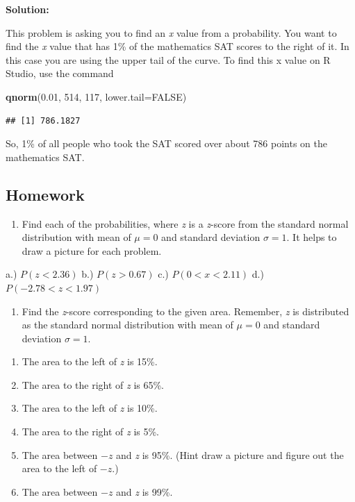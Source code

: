 \documentclass[
]{book}
\newenvironment{Shaded}{\begin{snugshade}}{\end{snugshade}}
\newcommand{\DataTypeTok}[1]{\textcolor[rgb]{0.13,0.29,0.53}{#1}}
\newcommand{\DecValTok}[1]{\textcolor[rgb]{0.00,0.00,0.81}{#1}}
\newcommand{\FloatTok}[1]{\textcolor[rgb]{0.00,0.00,0.81}{#1}}
\newcommand{\KeywordTok}[1]{\textcolor[rgb]{0.13,0.29,0.53}{\textbf{#1}}}
\newcommand{\NormalTok}[1]{#1}
\newcommand{\OtherTok}[1]{\textcolor[rgb]{0.56,0.35,0.01}{#1}}
\providecommand{\tightlist}{%
  \setlength{\itemsep}{0pt}\setlength{\parskip}{0pt}}
\begin{document}
\textbf{Solution:}

This problem is asking you to find an \emph{x} value from a probability. You want to find the \emph{x} value that has 1\% of the mathematics SAT scores to the right of it. In this case you are using the upper tail of the curve.
To find this x value on R Studio, use the command

\begin{Shaded}
\begin{Highlighting}[]
\KeywordTok{qnorm}\NormalTok{(}\FloatTok{0.01}\NormalTok{, }\DecValTok{514}\NormalTok{, }\DecValTok{117}\NormalTok{, }\DataTypeTok{lower.tail=}\OtherTok{FALSE}\NormalTok{)}
\end{Highlighting}
\end{Shaded}

\begin{verbatim}
## [1] 786.1827
\end{verbatim}

So, 1\% of all people who took the SAT scored over about 786 points on the mathematics SAT.

\hypertarget{homework-13}{%
\subsection{Homework}\label{homework-13}}

\begin{enumerate}
\def\labelenumi{\arabic{enumi}.}
\tightlist
\item
  Find each of the probabilities, where \emph{z} is a \emph{z}-score from the standard normal distribution with mean of \(\mu=0\) and standard deviation \(\sigma=1\). It helps to draw a picture for each problem.
\end{enumerate}

a.) \(P(z<2.36)\)
b.) \(P(z>0.67)\)
c.) \(P(0<x<2.11)\)
d.) \(P(-2.78<z<1.97)\)

\begin{enumerate}
\def\labelenumi{\arabic{enumi}.}
\setcounter{enumi}{1}
\tightlist
\item
  Find the \emph{z}-score corresponding to the given area. Remember, \emph{z} is distributed as the standard normal distribution with mean of \(\mu=0\) and standard deviation \(\sigma=1\).
\end{enumerate}

\begin{enumerate}
\def\labelenumi{\alph{enumi}.}
\tightlist
\item
  The area to the left of \emph{z} is 15\%.
\item
  The area to the right of \emph{z} is 65\%.
\item
  The area to the left of \emph{z} is 10\%.
\item
  The area to the right of \emph{z} is 5\%.
\item
  The area between \(-z\) and \emph{z} is 95\%. (Hint draw a picture and figure out the area to the left of \(-z\).)
\item
  The area between \(-z\) and \emph{z} is 99\%.
\end{enumerate}
\end{document}
